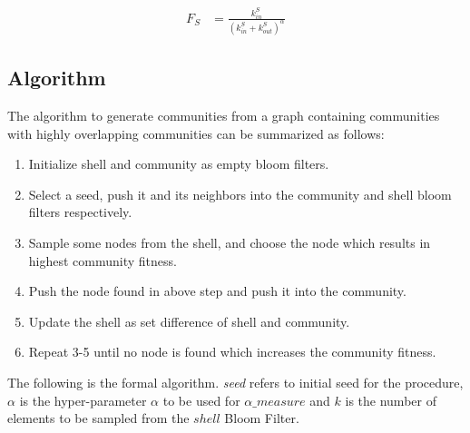 \documentclass[a4paper]{article}
\begin{document}
\begin{align*}
F_S 
&= \frac{k_{in}^S}{(k_{in}^S+k_{out}^S)^\alpha}  
\end{align*}





\subsection{Algorithm}

The algorithm to generate communities from a graph containing communities with highly overlapping communities can be summarized as follows:
\begin{enumerate}
    \item Initialize shell and community as empty bloom filters.
\item Select a seed, push it and its neighbors into the community and shell bloom filters respectively.
\item Sample some nodes from the shell, and choose the node which results in highest community fitness.
\item Push the node found in above step and push it into the community.
\item  Update the shell as set difference of shell and community.
\item Repeat 3-5 until no node is found which increases the community fitness.



\end{enumerate}


The following is the formal algorithm. \textit{seed} refers to initial seed for the procedure, $\alpha$ is the hyper-parameter $\alpha$ to be used for $\alpha\_measure$ and $k$ is the number of elements to be sampled from the $shell$ Bloom Filter.
 
\end{document}
